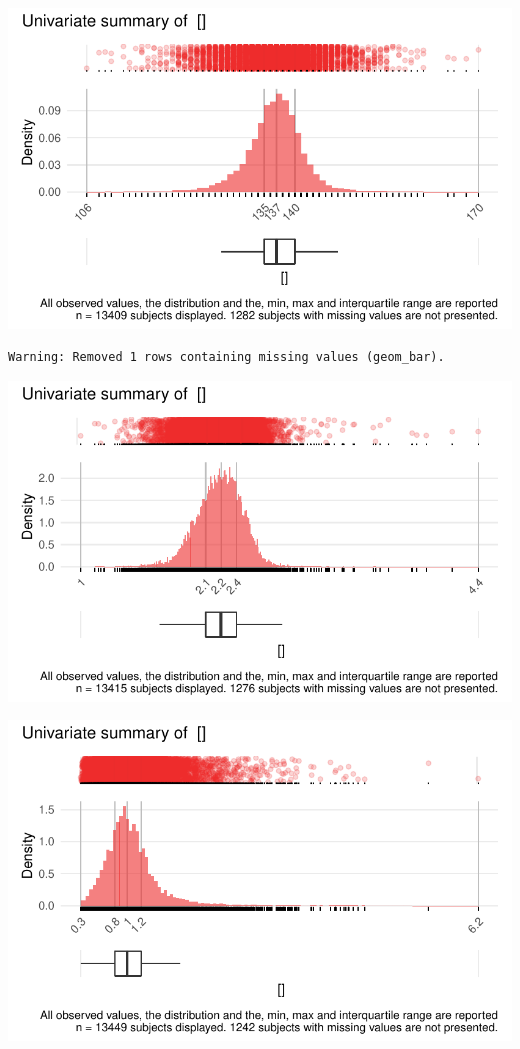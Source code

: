\documentclass[
  letterpaper,
  DIV=11,
  numbers=noendperiod]{scrreport}
\begin{document}
\includegraphics{./Bact_univar_files/figure-pdf/uni04-14.pdf}

\begin{verbatim}
Warning: Removed 1 rows containing missing values (geom_bar).
\end{verbatim}

\includegraphics{./Bact_univar_files/figure-pdf/uni04-15.pdf}

\includegraphics{./Bact_univar_files/figure-pdf/uni04-16.pdf}
\end{document}
